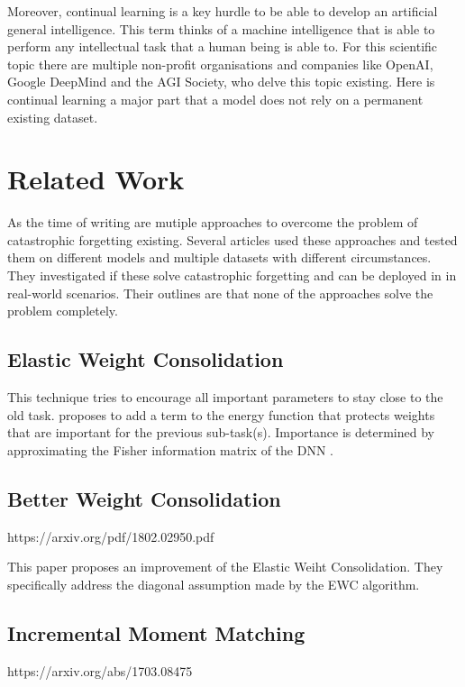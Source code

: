 Moreover, continual learning is a key hurdle to be able to develop an artificial general intelligence.
This term thinks of a machine intelligence that is able to perform any intellectual task that a human being is able to.
For this scientific topic there are multiple non-profit organisations and companies like OpenAI, Google DeepMind and the AGI Society, who delve this topic existing.
Here is continual learning a major part that a model does not rely on a permanent existing dataset.

\section{Related Work}

As the time of writing are mutiple approaches to overcome the problem of catastrophic forgetting existing.
Several articles used these approaches and tested them on different models and multiple datasets with different circumstances.
They investigated if these solve catastrophic forgetting and can be deployed in in real-world scenarios.
Their outlines are that none of the approaches solve the problem completely.
\cite{measuring_cf_in_nns, cf_with_hard_attention, cf_application_oriented_study}

\subsection*{Elastic Weight Consolidation}
This technique tries to encourage all important parameters to stay close to the old task.
proposes to add a term to the energy function that protects weights that are important for the previous sub-task(s). 
Importance is determined by approximating the Fisher information matrix of the DNN \cite{cf_application_oriented_study}.
\cite{elastic-weight-consolidation}

\subsection*{Better Weight Consolidation}
https://arxiv.org/pdf/1802.02950.pdf

This paper proposes an improvement of the Elastic Weiht Consolidation.
They specifically address the diagonal assumption made by the EWC algorithm.

\subsection*{Incremental Moment Matching}
https://arxiv.org/abs/1703.08475

